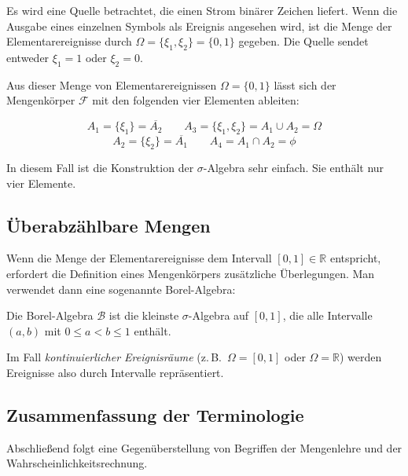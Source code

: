 \begin{beispiel}[Mengenkörper]
Es wird eine Quelle betrachtet, die einen Strom binärer Zeichen liefert. Wenn die Ausgabe eines einzelnen Symbols als Ereignis angesehen wird, ist die Menge der Elementarereignisse durch $\Omega = \{\xi_1, \xi_2\} = \{0,1\}$ gegeben. Die Quelle sendet entweder $\xi_1 = 1$ oder $\xi_2 = 0$.


Aus dieser Menge von Elementarereignissen $\Omega = \{0,1\}$ lässt sich der Mengenkörper $\mathcal{F}$ mit den folgenden vier Elementen ableiten:

$$
A_1 = \{\xi_1\} = \overline{A_2} \qquad A_3 = \{\xi_1, \xi_2\} = A_1 \cup A_2 = \Omega
$$
$$
A_2 = \{\xi_2\} = \overline{A_1} \qquad A_4 = A_1 \cap A_2 = \phi
$$

In diesem Fall ist die Konstruktion der $\sigma$-Algebra sehr einfach. Sie enthält nur vier Elemente.
\end{beispiel}

\subsection{Überabzählbare Mengen}
\label{sec:ueberabzaehlbare-mengen}

Wenn die Menge der Elementarereignisse dem Intervall $[0,1] \in \mathbb{R}$ entspricht, erfordert die Definition eines Mengenkörpers zusätzliche Überlegungen. Man verwendet dann eine sogenannte Borel-Algebra:

\begin{definition}
Die Borel-Algebra $\mathcal{B}$ ist die kleinste $\sigma$-Algebra auf $[0,1]$, die alle Intervalle $(a,b)$ mit $0 \leq a < b \leq 1$ enthält.
\end{definition}

Im Fall \textit{kontinuierlicher Ereignisräume} (z.\,B.\ $\Omega = [0,1]$ oder $\Omega = \mathbb{R}$) werden Ereignisse also durch Intervalle repräsentiert.

\subsection{Zusammenfassung der Terminologie}
\label{sec:wahrscheinlichkeit-terminologie}

Abschließend folgt eine Gegenüberstellung von Begriffen der Mengenlehre und der Wahrscheinlichkeitsrechnung.

